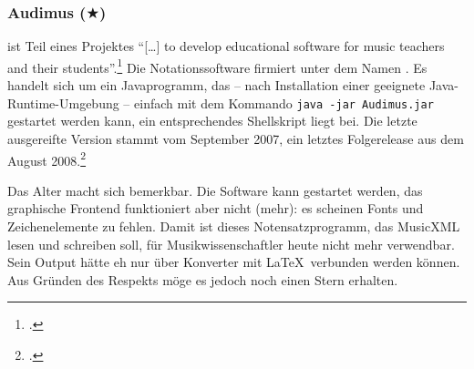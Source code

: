 %
%
%



\subsubsection{Audimus ($\bigstar$)}

\label{Audimus} ist Teil eines Projektes \enquote{[\ldots] to
develop educational software for music teachers and their
students}.\footcite[vgl.][\nopage wp]{Audimus2008a} Die Notationssoftware
firmiert unter dem Namen . Es handelt sich um ein
Javaprogramm, das -- nach Installation einer geeignete Java-Runtime-Umgebung --
einfach mit dem Kommando \texttt{java -jar Audimus.jar} gestartet werden kann,
ein entsprechendes Shellskript liegt bei. Die letzte ausgereifte Version stammt
vom September 2007, ein letztes Folgerelease aus dem August
2008.\footcite[vgl.][\nopage wp]{Audimus2008b}

Das Alter macht sich bemerkbar. Die Software kann gestartet werden, das
graphische Frontend funktioniert aber nicht (mehr): es scheinen Fonts und
Zeichenelemente zu fehlen. Damit ist dieses Notensatzprogramm, das MusicXML
lesen und schreiben soll, für Musikwissenschaftler heute nicht mehr verwendbar.
Sein Output hätte eh nur über Konverter mit \LaTeX\ verbunden werden können. Aus
Gründen des Respekts möge es jedoch noch einen Stern erhalten.



%
